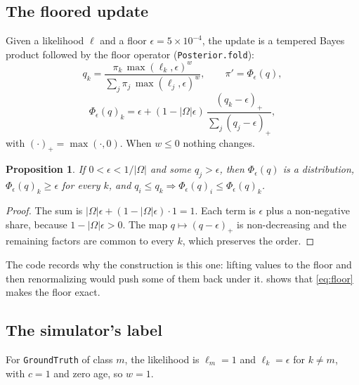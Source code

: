 \documentclass[11pt,a4paper]{article}
\newtheorem{proposition}{Proposition}
\theoremstyle{definition}
\theoremstyle{remark}
\newcommand{\code}[1]{\texttt{#1}}
\begin{document}
\subsection{The floored update}

Given a likelihood $\boldsymbol\ell$ and a floor $\epsilon = 5\times10^{-4}$, the
update is a tempered Bayes product followed by the floor operator
(\code{Posterior.fold}):
\begin{equation}
\label{eq:bayes}
q_k = \frac{\pi_k\,\max(\ell_k,\epsilon)^{w}}{\sum_j \pi_j\,\max(\ell_j,\epsilon)^{w}},
\qquad
\pi' = \Phi_\epsilon(q),
\end{equation}
\begin{equation}
\label{eq:floor}
\Phi_\epsilon(q)_k = \epsilon + (1 - |\Omega|\epsilon)\,
\frac{(q_k - \epsilon)_+}{\sum_j (q_j-\epsilon)_+},
\end{equation}
with $(\cdot)_+ = \max(\cdot,0)$. When $w\le0$ nothing changes.

\begin{proposition}
\label{prop:floor}
If $0<\epsilon<1/|\Omega|$ and some $q_j>\epsilon$, then $\Phi_\epsilon(q)$ is a
distribution, $\Phi_\epsilon(q)_k\ge\epsilon$ for every $k$, and
$q_i \le q_k \Rightarrow \Phi_\epsilon(q)_i \le \Phi_\epsilon(q)_k$.
\end{proposition}
\begin{proof}
The sum is $|\Omega|\epsilon + (1-|\Omega|\epsilon)\cdot 1 = 1$. Each term is
$\epsilon$ plus a non-negative share, because $1-|\Omega|\epsilon>0$. The map
$q\mapsto (q-\epsilon)_+$ is non-decreasing and the remaining factors are common
to every $k$, which preserves the order.
\end{proof}

The code records why the construction is this one: lifting values to the floor
and then renormalizing would push some of them back under it.
 shows that \eqref{eq:floor} makes the floor exact.

\subsection{The simulator's label}

For \code{GroundTruth} of class $m$, the likelihood is $\ell_m = 1$ and
$\ell_k = \epsilon$ for $k\ne m$, with $c = 1$ and zero age, so $w = 1$.
\end{document}
